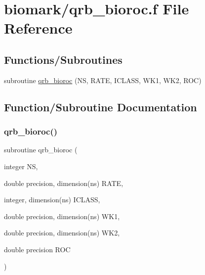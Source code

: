 \hypertarget{qrb__bioroc_8f}{}\section{biomark/qrb\+\_\+bioroc.f File Reference}
\label{qrb__bioroc_8f}
\subsection*{Functions/\+Subroutines}
\begin{DoxyCompactItemize}
\item 
subroutine \hyperlink{qrb__bioroc_8f_ab4990895bc910295aa81f037bb08a29c}{qrb\+\_\+bioroc} (NS, R\+A\+TE, I\+C\+L\+A\+SS, W\+K1, W\+K2, R\+OC)
\end{DoxyCompactItemize}


\subsection{Function/\+Subroutine Documentation}
\mbox{\label{qrb__bioroc_8f_ab4990895bc910295aa81f037bb08a29c}} 
\subsubsection{\texorpdfstring{qrb\+\_\+bioroc()}{qrb\_bioroc()}}
{\footnotesize\ttfamily subroutine qrb\+\_\+bioroc (\begin{DoxyParamCaption}\item[{integer}]{NS,  }\item[{double precision, dimension(ns)}]{R\+A\+TE,  }\item[{integer, dimension(ns)}]{I\+C\+L\+A\+SS,  }\item[{double precision, dimension(ns)}]{W\+K1,  }\item[{double precision, dimension(ns)}]{W\+K2,  }\item[{double precision}]{R\+OC }\end{DoxyParamCaption})}


